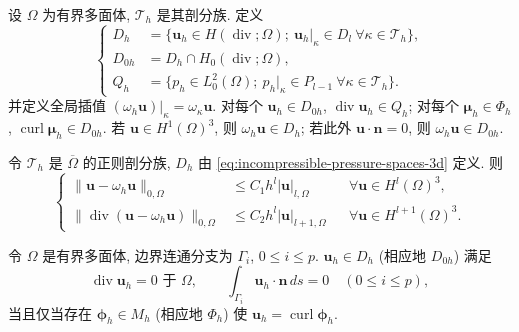 设 $\Omega$ 为有界多面体, $\mathcal T_h$ 是其剖分族. 定义
\begin{equation}\label{eq:incompressible-pressure-spaces-3d}
\left\{
\begin{aligned}
D_h&=\{\mathbf u_h\in H(\operatorname{div};\Omega);
\ \mathbf u_h|_\kappa\in D_l
\ \forall\kappa\in\mathcal T_h\},\\
D_{0h}&=D_h\cap H_0(\operatorname{div};\Omega),\\
Q_h&=\{p_h\in L_0^2(\Omega);
\ p_h|_\kappa\in P_{l-1}
\ \forall\kappa\in\mathcal T_h\}.
\end{aligned}
\right.
\end{equation}
并定义全局插值
$(\omega_h\mathbf u)|_\kappa=\omega_\kappa\mathbf u$.
对每个 $\mathbf u_h\in D_{0h}$,
$\operatorname{div}\mathbf u_h\in Q_h$;
对每个 $\boldsymbol\mu_h\in\Phi_h$,
$\operatorname{curl}\boldsymbol\mu_h\in D_{0h}$.
若 $\mathbf u\in H^1(\Omega)^3$, 则
$\omega_h\mathbf u\in D_h$;
若此外 $\mathbf u\cdot\mathbf n=0$, 则
$\omega_h\mathbf u\in D_{0h}$.

\begin{Proposition}\label{prop:incompressible-pressure-approximation-3d}
令 $\mathcal T_h$ 是 $\overline\Omega$ 的正则剖分族,
$D_h$ 由 \eqref{eq:incompressible-pressure-spaces-3d} 定义.
则
\begin{equation}\label{eq:incompressible-pressure-approximation-3d}
\left\{
\begin{aligned}
\|\mathbf u-\omega_h\mathbf u\|_{0,\Omega}
&\leq C_1h^l|\mathbf u|_{l,\Omega}
&&\forall\mathbf u\in H^l(\Omega)^3,\\
\|\operatorname{div}(\mathbf u-\omega_h\mathbf u)\|_{0,\Omega}
&\leq C_2h^l|\mathbf u|_{l+1,\Omega}
&&\forall\mathbf u\in H^{l+1}(\Omega)^3.
\end{aligned}
\right.
\end{equation}
\end{Proposition}

\begin{Lemma}\label{lem:incompressible-pressure-curl-characterization-3d}
令 $\Omega$ 是有界多面体, 边界连通分支为
$\Gamma_i$, $0\leq i\leq p$.
$\mathbf u_h\in D_h$ (相应地 $D_{0h}$) 满足
\[
\operatorname{div}\mathbf u_h=0\text{ 于 }\Omega,
\qquad
\int_{\Gamma_i}\mathbf u_h\cdot\mathbf n\,ds=0
\quad(0\leq i\leq p),
\]
当且仅当存在 $\boldsymbol\phi_h\in M_h$
(相应地 $\Phi_h$) 使
$\mathbf u_h=\operatorname{curl}\boldsymbol\phi_h$.
\end{Lemma}

